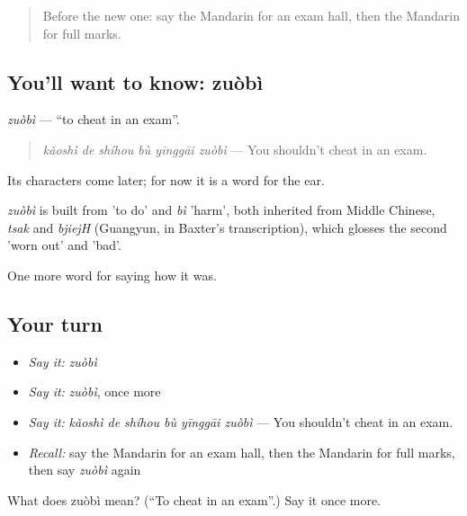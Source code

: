 \label{lesson:ZH-C495-zuobi}



\begin{quote}
Before the new one: say the Mandarin for an exam hall, then the Mandarin for full marks.
\end{quote}

\subsection*{You'll want to know: zuòbì}
\emph{zuòbì} — \textquotedblleft{}to cheat in an exam\textquotedblright{}.

\begin{quote}
\emph{kǎoshì de shíhou bù yīnggāi zuòbì} — You shouldn't cheat in an exam.
\end{quote}

Its characters come later; for now it is a word for the ear.

\begin{cousinweb}
\emph{zuòbì} is built from  'to do' and \emph{bì} 'harm', both inherited from Middle Chinese, \emph{tsak} and \emph{bjiejH} (Guangyun, in Baxter's transcription), which glosses the second 'worn out' and 'bad'.
\end{cousinweb}

\begin{grammarlens}[title={What you've built}]
One more word for saying how it was.
\end{grammarlens}

\subsection*{Your turn}
\begin{itemize}
\raggedright
  \item \emph{Say it:} \emph{zuòbì}
  \item \emph{Say it:} \emph{zuòbì}, once more
  \item \emph{Say it:} \emph{kǎoshì de shíhou bù yīnggāi zuòbì} — You shouldn't cheat in an exam.
  \item \emph{Recall:} say the Mandarin for an exam hall, then the Mandarin for full marks, then say \emph{zuòbì} again
\end{itemize}

\begin{tcolorbox}[breakable,colback=teal!4,colframe=teal!35!black,title={Before you move on}]
What does zuòbì mean? (\textquotedblleft{}To cheat in an exam\textquotedblright{}.) Say it once more.
\end{tcolorbox}

